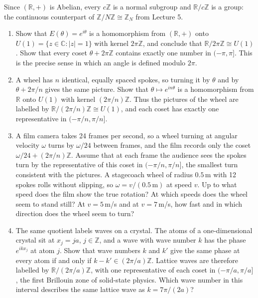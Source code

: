 \documentclass[11pt,a4paper]{article}
\newcommand{\Z}{\mathbb{Z}}
\newcommand{\R}{\mathbb{R}}
\newcommand{\C}{\mathbb{C}}
\newcommand{\problem}[1]{\par\vspace{0.9em}\noindent{\bfseries #1}\par\vspace{0.1em}}
\begin{document}
\problem{3. Angles, spokes and the wagon-wheel effect}
Since $(\R, +)$ is Abelian, every $c\Z$ is a normal subgroup and $\R/c\Z$ is a group: the continuous counterpart of $\Z/N\Z \cong \Z_N$ from Lecture 5.
\begin{enumerate}
  \item Show that $E(\theta) = e^{i\theta}$ is a homomorphism from $(\R, +)$ onto $U(1) = \{z \in \C : |z| = 1\}$ with kernel $2\pi\Z$, and conclude that $\R/2\pi\Z \cong U(1)$. Show that every coset $\theta + 2\pi\Z$ contains exactly one number in $(-\pi, \pi]$. This is the precise sense in which an angle is defined modulo $2\pi$.
  \item A wheel has $n$ identical, equally spaced spokes, so turning it by $\theta$ and by $\theta + 2\pi/n$ gives the same picture. Show that $\theta \mapsto e^{in\theta}$ is a homomorphism from $\R$ onto $U(1)$ with kernel $(2\pi/n)\Z$. Thus the pictures of the wheel are labelled by $\R/(2\pi/n)\Z \cong U(1)$, and each coset has exactly one representative in $(-\pi/n, \pi/n]$.
  \item A film camera takes 24 frames per second, so a wheel turning at angular velocity $\omega$ turns by $\omega/24$ between frames, and the film records only the coset $\omega/24 + (2\pi/n)\Z$. Assume that at each frame the audience sees the spokes turn by the representative of this coset in $(-\pi/n, \pi/n]$, the smallest turn consistent with the pictures. A stagecoach wheel of radius $0.5$\,m with 12 spokes rolls without slipping, so $\omega = v/(0.5\,\text{m})$ at speed $v$.
  Up to what speed does the film show the true rotation? At which speeds does the wheel seem to stand still? At $v = 5$\,m/s and at $v = 7$\,m/s, how fast and in which direction does the wheel seem to turn?
  \item The same quotient labels waves on a crystal. The atoms of a one-dimensional crystal sit at $x_j = ja$, $j \in \Z$, and a wave with wave number $k$ has the phase $e^{ikx_j}$ at atom $j$. Show that wave numbers $k$ and $k'$ give the same phase at every atom if and only if $k - k' \in (2\pi/a)\Z$. Lattice waves are therefore labelled by $\R/(2\pi/a)\Z$, with one representative of each coset in $(-\pi/a, \pi/a]$, the first Brillouin zone of solid-state physics. Which wave number in this interval describes the same lattice wave as $k = 7\pi/(2a)$?
\end{enumerate}
\end{document}

